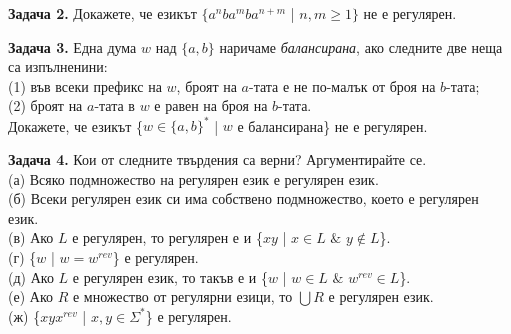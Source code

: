 \documentclass[openany]{book}
\begin{document}
    \vspace{15pt}

    \textbf{Задача 2.} Докажете, че езикът $\{a^nba^mba^{n+m}$ | $n,m \geq 1\}$ не е 
    регулярен.

    \vspace{15pt}

    \textbf{Задача 3.} Една дума $w$ над $\{a,b\}$ наричаме \textit{балансирана}, ако следните
    две неща са изпълненини: \\
    (1) във всеки префикс на $w$, броят на $a$-тата е не по-малък от броя на $b$-тата; \\
    (2) броят на $a$-тата в $w$ е равен на броя на $b$-тата. \\
    Докажете, че езикът \{$w \in \{a,b\}^*$ | $w$ е балансирана\} не е регулярен.

    \vspace{15pt}

    \textbf{Задача 4.} Кои от следните твърдения са верни? Аргументирайте се.\\
    (а) Всяко подмножество на регулярен език е регулярен език. \\
    (б) Всеки регулярен език си има собствено подмножество, което е регулярен език. \\
    (в) Ако $L$ е регулярен, то регулярен е и \{$xy$ | $x \in L$ $\&$ $y \notin L$\}. \\
    (г) \{$w$ | $w = w^{rev}$\} е регулярен. \\
    (д) Ако $L$ е регулярен език, то такъв е и \{$w$ | $w \in L$ $\&$ $w^{rev} \in L$\}. \\
    (е) Ако $R$ е множество от регулярни езици, то $\bigcup R$ е регулярен език. \\
    (ж) \{$xyx^{rev}$ | $x,y \in \Sigma^*$\} е регулярен.
\vspace{25pt}
\end{document}
